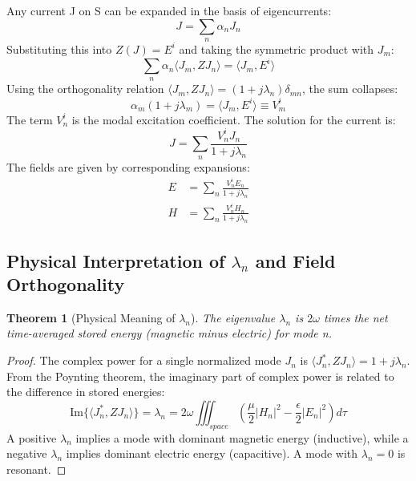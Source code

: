 \documentclass[11pt,a4paper]{article}
\newtheorem{theorem}{Theorem}[section]
\begin{document}
Any current J on S can be expanded in the basis of eigencurrents:
\begin{equation}
    J=\sum_{n}\alpha_{n}J_{n}
\end{equation}
Substituting this into \(Z(J)=E^{i}\) and taking the symmetric product with \(J_{m}\):
\begin{equation}
    \sum_{n}\alpha_{n}\langle J_{m},ZJ_{n}\rangle=\langle J_{m},E^{i}\rangle
\end{equation}
Using the orthogonality relation \(\langle J_{m},ZJ_{n}\rangle=(1+j\lambda_{n})\delta_{mn}\), the sum collapses:
\begin{equation}
    \alpha_{m}(1+j\lambda_{m})=\langle J_{m},E^{i}\rangle\equiv V_{m}^{i}
\end{equation}
The term \(V_{n}^{i}\) is the modal excitation coefficient. The solution for the current is:
\begin{equation}
    J=\sum_{n}\frac{V_{n}^{i}J_{n}}{1+j\lambda_{n}}
\end{equation}
The fields are given by corresponding expansions:
\begin{align}
    E &= \sum_{n}\frac{V_{n}^{i}E_{n}}{1+j\lambda_{n}} \\
    H &= \sum_{n}\frac{V_{n}^{i}H_{n}}{1+j\lambda_{n}}
\end{align}

\subsection{Physical Interpretation of \(\lambda_{n}\) and Field Orthogonality}

\begin{theorem}[Physical Meaning of \(\lambda_{n}\)]
The eigenvalue \(\lambda_{n}\) is \(2\omega\) times the net time-averaged stored energy (magnetic minus electric) for mode n.
\end{theorem}
\begin{proof}
The complex power for a single normalized mode \(J_{n}\) is \(\langle J_{n}^{*},ZJ_{n}\rangle=1+j\lambda_{n}\). From the Poynting theorem, the imaginary part of complex power is related to the difference in stored energies:
\begin{equation}
    \text{Im}\{\langle J_{n}^{*},ZJ_{n}\rangle\}=\lambda_{n}=2\omega\iiint_{space}\left(\frac{\mu}{2}|H_{n}|^{2}-\frac{\epsilon}{2}|E_{n}|^{2}\right)d\tau
\end{equation}
A positive \(\lambda_{n}\) implies a mode with dominant magnetic energy (inductive), while a negative \(\lambda_{n}\) implies dominant electric energy (capacitive). A mode with \(\lambda_{n}=0\) is resonant.
\end{proof}
\end{document}
